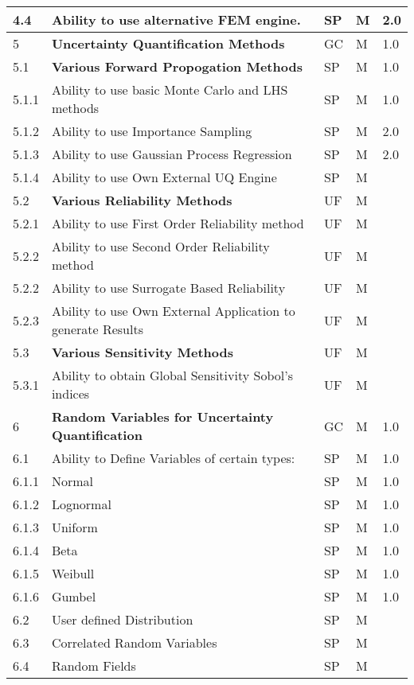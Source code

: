 \begin{longtable}{| p{} | p{} | p{} | p{} |  p{} |}
  4.4 & Ability to use alternative FEM engine. & SP & M & 2.0 \\ \hline
  5 & \textbf{Uncertainty Quantification Methods} &  GC & M & 1.0  \\ \hline
  5.1 & \textbf{Various Forward Propogation Methods} & SP & M & 1.0  \\ \hline
  5.1.1 & Ability to use basic  Monte Carlo and LHS methods & SP & M & 1.0 \\ \hline
  5.1.2 & Ability to use Importance Sampling  & SP & M & 2.0 \\ \hline
  5.1.3 & Ability to use Gaussian Process Regression & SP & M & 2.0 \\ \hline
  5.1.4 & Ability to use Own External UQ Engine & SP & M &  \\ \hline
  5.2 & \textbf{Various Reliability Methods} & UF & M &  \\ \hline
  5.2.1 & Ability to use First Order Reliability method & UF & M &  \\ \hline
  5.2.2 & Ability to use Second Order Reliability method & UF & M & \\ \hline
  5.2.2 & Ability to use Surrogate Based Reliability & UF & M & \\ \hline
  5.2.3 & Ability to use Own External Application to generate Results & UF & M &  \\ \hline
  5.3 & \textbf{Various Sensitivity Methods} & UF & M &  \\ \hline
  5.3.1 & Ability to obtain Global Sensitivity Sobol's indices & UF & M &  \\ \hline
    6 & \textbf{Random Variables for Uncertainty Quantification} & GC & M & 1.0  \\ \hline
    6.1 & Ability to Define Variables of certain types: & SP & M & 1.0  \\ 
    6.1.1 & Normal & SP & M  & 1.0 \\ \hline
    6.1.2 & Lognormal & SP & M & 1.0 \\ \hline
    6.1.3 & Uniform & SP & M & 1.0  \\ \hline
    6.1.4 & Beta & SP & M & 1.0 \\ \hline
    6.1.5 & Weibull &  SP & M  & 1.0 \\ \hline
    6.1.6 & Gumbel &  SP & M & 1.0  \\ \hline
    6.2 & User defined Distribution & SP & M &  \\ \hline
    6.3 & Correlated Random Variables & SP & M &  \\ \hline
    6.4 & Random Fields & SP & M &  \\ \hline

\end{longtable}
